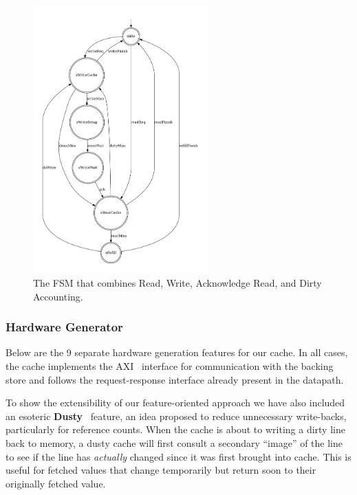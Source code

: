 \documentclass[conference]{IEEEtran}
\begin{document}
\begin{figure}[ht]
    \centering
    \includegraphics[width=0.6\textwidth]{isca2023-latex-template/figures/writeBackFSM.pdf}
    \caption{The FSM that combines Read, Write, Acknowledge Read, and Dirty Accounting.}
    \label{fig:writeBackFSM}
\end{figure}

\subsubsection{Hardware Generator}\label{sec:hwFeatures}
Below are the 9 separate hardware generation features for our cache. In all cases, the cache implements the AXI~\cite{AXI} interface for communication with the backing store and follows the request-response interface already present in the \Riscvmini{} datapath.

To show the extensibility of our feature-oriented approach we have also included an esoteric \textbf{Dusty}~\cite{Krishna:06, Friedman:05} feature, an idea proposed to reduce unnecessary write-backs, particularly for reference counts.   When the cache is about to writing a dirty line back to memory, a dusty cache will first consult a secondary ``image'' of the line to see if the line has \emph{actually} changed since it was first brought into cache. This is useful for fetched values that change temporarily but return soon to their originally fetched value.
\end{document}
